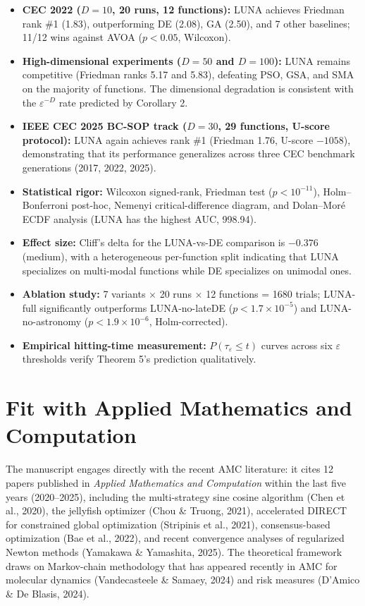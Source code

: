 \documentclass[11pt,a4paper]{article}
\begin{document}
\begin{itemize}
\item \textbf{CEC 2022 ($D=10$, 20 runs, 12 functions):} LUNA achieves Friedman rank \#1 (1.83), outperforming DE (2.08), GA (2.50), and 7 other baselines; 11/12 wins against AVOA ($p < 0.05$, Wilcoxon).
\item \textbf{High-dimensional experiments ($D=50$ and $D=100$):} LUNA remains competitive (Friedman ranks 5.17 and 5.83), defeating PSO, GSA, and SMA on the majority of functions. The dimensional degradation is consistent with the $\varepsilon^{-D}$ rate predicted by Corollary 2.
\item \textbf{IEEE CEC 2025 BC-SOP track ($D=30$, 29 functions, U-score protocol):} LUNA again achieves rank \#1 (Friedman 1.76, U-score $-1058$), demonstrating that its performance generalizes across three CEC benchmark generations (2017, 2022, 2025).
\item \textbf{Statistical rigor:} Wilcoxon signed-rank, Friedman test ($p < 10^{-11}$), Holm--Bonferroni post-hoc, Nemenyi critical-difference diagram, and Dolan--Mor\'e ECDF analysis (LUNA has the highest AUC, 998.94).
\item \textbf{Effect size:} Cliff's delta for the LUNA-vs-DE comparison is $-0.376$ (medium), with a heterogeneous per-function split indicating that LUNA specializes on multi-modal functions while DE specializes on unimodal ones.
\item \textbf{Ablation study:} 7 variants $\times$ 20 runs $\times$ 12 functions = 1680 trials; LUNA-full significantly outperforms LUNA-no-lateDE ($p < 1.7 \times 10^{-5}$) and LUNA-no-astronomy ($p < 1.9 \times 10^{-6}$, Holm-corrected).
\item \textbf{Empirical hitting-time measurement:} $P(\tau_\varepsilon \leq t)$ curves across six $\varepsilon$ thresholds verify Theorem 5's prediction qualitatively.
\end{itemize}

\section*{Fit with Applied Mathematics and Computation}

The manuscript engages directly with the recent AMC literature: it cites 12 papers published in \textit{Applied Mathematics and Computation} within the last five years (2020--2025), including the multi-strategy sine cosine algorithm (Chen et al., 2020), the jellyfish optimizer (Chou \& Truong, 2021), accelerated DIRECT for constrained global optimization (Stripinis et al., 2021), consensus-based optimization (Bae et al., 2022), and recent convergence analyses of regularized Newton methods (Yamakawa \& Yamashita, 2025). The theoretical framework draws on Markov-chain methodology that has appeared recently in AMC for molecular dynamics (Vandecasteele \& Samaey, 2024) and risk measures (D'Amico \& De Blasis, 2024).
\end{document}
